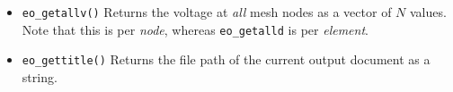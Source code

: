 \begin{itemize}
\item{\tt eo\_getallv()} Returns the voltage at {\em all} mesh nodes as a vector
of $N$ values.  Note that this is per {\em node}, whereas {\tt eo\_getalld} is
per {\em element}.


\item{\tt eo\_gettitle()} Returns the file path of the current output document as a string.

\end{itemize}
